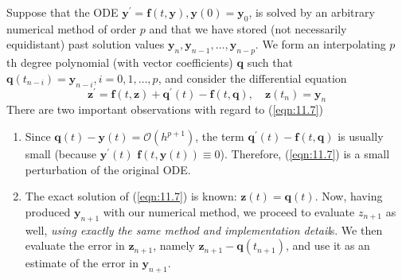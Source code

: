 \documentclass[a4paper]{article}
\begin{document}
\begin{technique}
    Suppose that the ODE $\mathbf{y}^{\prime}=\mathbf{f}(t, \mathbf{y}), \mathbf{y}(0)=\mathbf{y}_0$, is solved by an arbitrary numerical method of order $p$ and that we have stored (not necessarily equidistant) past solution values $\mathbf{y}_n, \mathbf{y}_{n-1}, \ldots, \mathbf{y}_{n-p}$. We form an interpolating $p$ th degree polynomial (with vector coefficients) $\mathbf{q}$ such that $\mathbf{q}\left(t_{n-i}\right)=\mathbf{y}_{n-i}, i=0,1, \ldots, p$, and consider the differential equation
    \begin{equation}\label{eqn:11.7}
        \mathbf{z}^{\prime}=\mathbf{f}(t, \mathbf{z})+\mathbf{q}^{\prime}(t)-\mathbf{f}(t, \mathbf{q}), \quad \mathbf{z}\left(t_n\right)=\mathbf{y}_n
    \end{equation}
    There are two important observations with regard to (\ref{eqn:11.7})

    \begin{enumerate}[(1)]
        \item Since $\mathbf{q}(t)-\mathbf{y}(t)=\mathcal{O}\left(h^{p+1}\right)$, the term $\mathbf{q}^{\prime}(t)-\mathbf{f}(t, \mathbf{q})$ is usually small (because $\mathbf{y}^{\prime}(t)$ $\mathbf{f}(t, \mathbf{y}(t)) \equiv 0$). Therefore, (\ref{eqn:11.7}) is a small perturbation of the original ODE.
    
        \item The exact solution of (\ref{eqn:11.7}) is known: $\mathbf{z}(t)=\mathbf{q}(t)$. Now, having produced $\mathbf{y}_{n+1}$ with our numerical method, we proceed to evaluate $z_{n+1}$ as well, \textit{using exactly the same method and implementation detail}s. We then evaluate the error in $\mathbf{z}_{n+1}$, namely $\mathbf{z}_{n+1}-\mathbf{q}\left(t_{n+1}\right)$, and use it as an estimate of the error in $\mathbf{y}_{n+1}$.
    \end{enumerate}
\end{technique}
\end{document}
